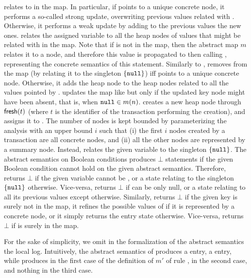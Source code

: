  relates  to  in the map. In particular, if  points to a unique concrete node, it performs a so-called strong update, overwriting previous values related with . Otherwise, it performs a weak update by adding to the previous values the new ones.  relates the assigned variable  to all the heap nodes of values that might be related with  in the map. Note that if  is not in the map, then the abstract map $m$ relates it to a  node, and therefore this value is propagated to  then calling , representing the concrete semantics of this statement. Similarly to ,  removes  from the map (by relating it to the singleton $\{\mathtt{null}\}$) iff  points to a unique concrete node. Otherwise, it adds the heap node  to the heap nodes related to all the values pointed by .  updates the map like  but only if the updated key node might have been absent, that is, when $\mathtt{null} \in m(n)$.  creates a new heap node through $\mathsf{fresh}(t)$ (where $t$ is the identifier of the transaction performing the creation), and assigns it to . The number of nodes is kept bounded by parameterizing the analysis with an upper bound $i$ such that (i) the first $i$ nodes created by a transaction are all concrete nodes, and (ii) all the other nodes are represented by a summary node. Instead,  relates the given variable to the singleton $\{\mathtt{null}\}$.
The abstract semantics on Boolean conditions produces $\bot$ statements if the given Boolean condition cannot hold on the given abstract semantics. Therefore,  returns $\bot$ if the given variable  cannot be , or a state relating  to the singleton $\{\mathtt{null}\}$ otherwise. Vice-versa,  returns $\bot$ if  can be only null, or a state relating  to all its previous values except  otherwise.
Similarly,  returns $\bot$ if the given key  is surely not in the map, it refines the possible values of  if it is represented by a concrete node, or it simply returns the entry state otherwise. Vice-versa,  returns $\bot$ if  is surely in the map.

For the sake of simplicity, we omit in the formalization of the abstract semantics the local log. Intuitively, the abstract semantics of  produces a  entry,  a  entry, while  produces  in the first case of the definition of $m'$ of rule ,  in the second case, and nothing in the third case.

